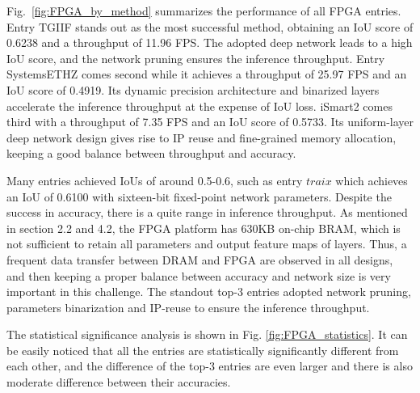 \documentclass[10pt,journal,compsoc]{IEEEtran}
\begin{document}

Fig.~\ref{fig:FPGA_by_method} summarizes the performance of all FPGA entries.
Entry TGIIF stands out as the most successful method, obtaining an IoU score of 0.6238 and a throughput of 11.96 FPS. The adopted deep network leads to a high IoU score, and the network pruning ensures the inference throughput.
Entry SystemsETHZ comes second while it achieves a throughput of 25.97 FPS and an IoU score of 0.4919.
Its dynamic precision architecture and binarized layers accelerate the inference throughput at the expense of IoU loss.
iSmart2 comes third with a throughput of 7.35 FPS and an IoU score of 0.5733.
Its uniform-layer deep network design gives rise to IP reuse and fine-grained memory allocation, keeping a good balance between throughput and accuracy.



Many entries achieved IoUs of around 0.5-0.6, such as entry $traix$ which achieves an IoU of 0.6100 with sixteen-bit fixed-point network parameters.
Despite the success in accuracy, there is a quite range in inference throughput.
As mentioned in section 2.2 and 4.2, the FPGA platform has 630KB on-chip BRAM, which is not sufficient to retain all parameters and  output feature maps of layers.
Thus, a frequent data transfer between DRAM and FPGA are observed in all designs, and then keeping a proper balance between accuracy and network size is very important in this challenge.
The standout top-3 entries adopted network pruning, parameters binarization and IP-reuse to ensure the inference throughput.

The statistical significance analysis is shown in Fig. \ref{fig:FPGA_statistics}.
It can be easily noticed that all the entries are statistically significantly different from each other, and the difference of the top-3 entries are even larger and there is also moderate difference between their accuracies.
\end{document}
